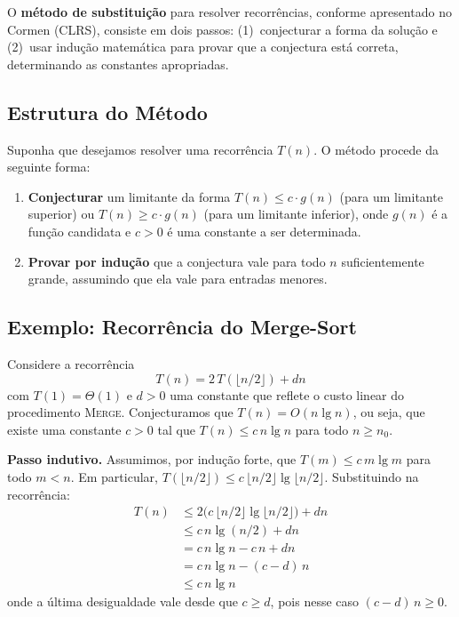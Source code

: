 \documentclass[9pt,a4paper]{extarticle}
\begin{document}
O \textbf{método de substituição} para resolver recorrências, conforme apresentado no Cormen (CLRS), consiste em dois passos: (1)~conjecturar a forma da solução e (2)~usar indução matemática para provar que a conjectura está correta, determinando as constantes apropriadas.

\subsection{Estrutura do Método}

Suponha que desejamos resolver uma recorrência $T(n)$. O método procede da seguinte forma:

\begin{enumerate}
    \item \textbf{Conjecturar} um limitante da forma $T(n) \leq c \cdot g(n)$ (para um limitante superior) ou $T(n) \geq c \cdot g(n)$ (para um limitante inferior), onde $g(n)$ é a função candidata e $c > 0$ é uma constante a ser determinada.
    \item \textbf{Provar por indução} que a conjectura vale para todo $n$ suficientemente grande, assumindo que ela vale para entradas menores.
\end{enumerate}

\subsection{Exemplo: Recorrência do Merge-Sort}

Considere a recorrência
%
\[
T(n) = 2\,T(\lfloor n/2 \rfloor) + dn
\]
%
\noindent com $T(1) = \Theta(1)$ e $d > 0$ uma constante que reflete o custo linear do procedimento \textsc{Merge}. Conjecturamos que $T(n) = O(n \lg n)$, ou seja, que existe uma constante $c > 0$ tal que $T(n) \leq c\,n\lg n$ para todo $n \geq n_0$.

\textbf{Passo indutivo.} Assumimos, por indução forte, que $T(m) \leq c\,m\lg m$ para todo $m < n$. Em particular, $T(\lfloor n/2 \rfloor) \leq c\,\lfloor n/2 \rfloor \lg \lfloor n/2 \rfloor$. Substituindo na recorrência:
%
\begin{align*}
T(n) &\leq 2\bigl(c\,\lfloor n/2 \rfloor \lg \lfloor n/2 \rfloor\bigr) + dn \\
     &\leq c\,n\lg(n/2) + dn \\
     &= c\,n\lg n - c\,n + dn \\
     &= c\,n\lg n - (c - d)\,n \\
     &\leq c\,n\lg n
\end{align*}
%
\noindent onde a última desigualdade vale desde que $c \geq d$, pois nesse caso $(c - d)\,n \geq 0$.
\end{document}
